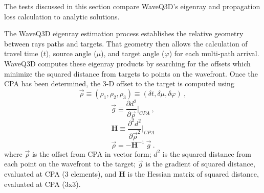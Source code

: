 \documentclass{ws-jca}
\begin{document}
The tests discussed in this section compare WaveQ3D's eigenray and propagation
loss calculation to analytic solutions.

The WaveQ3D eigenray estimation process establishes the relative geometry
between rays paths and targets. That geometry then allows the calculation
of travel time ($t$), source angle (\(\mu\)), and target angle
(\(\varphi\)) for each multi-path arrival. WaveQ3D computes these eigenray
products by searching for the offsets which minimize the squared distance
from targets to points on the wavefront. Once the CPA has been determined,
the 3-D offset to the target is computed using
\begin{equation}
	\vec{\rho} \equiv (\rho_1, \rho_2, \rho_3) 
		\equiv (\delta t, \delta \mu, \delta \varphi) \:,
	\label{eq:rho_defined}
\end{equation}
\begin{equation}
	\vec{g} \equiv \frac{\partial d^2}{\partial \vec{\rho} } \big|_{CPA} \:,
	\label{eq:taylor3}
\end{equation}
\begin{equation}
	\mathbf{H} \equiv \frac{\partial^2 d^2}{\partial \vec{\rho}^2 } \big|_{CPA}
	\label{eq:taylor4}
\end{equation}
\begin{equation}
	\vec{\rho} = - \mathbf{H}^{-1} \: \vec{g} \:.
	\label{eq:inverse3}
\end{equation}
where 
\(\vec{\rho}\) is the offset from CPA in vector form;
\(d^2\) is the squared distance from each point on the wavefront to the target;
\(\vec{g}\) is the gradient of squared distance, evaluated at CPA (3 elements), and
\(\mathbf{H}\) is the Hessian matrix of squared distance, evaluated at CPA (3x3).
\end{document}
